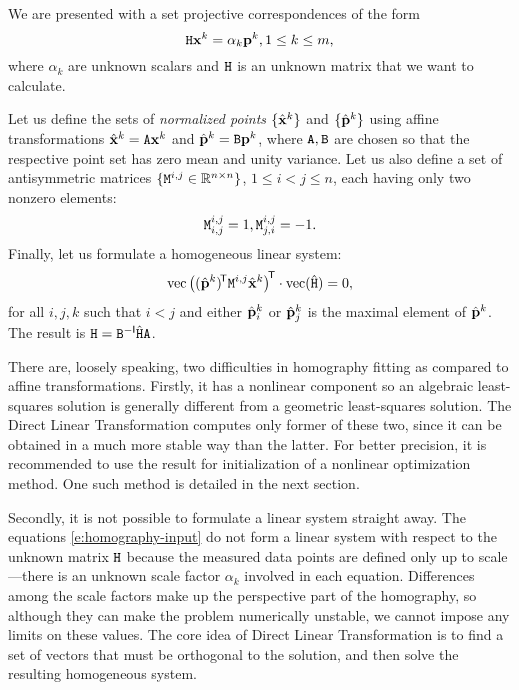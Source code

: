 We are presented with a set projective correspondences of the form
\begin{equation} \label{e:homography-input}
\mathtt{H} \mathbf{x}^k = \alpha_k \mathbf{p}^k, 1 \leq k \leq m,
\end{equation}
where $\alpha_k$ are unknown scalars and $\mathtt{H}$ is an unknown matrix that we want to calculate.

Let us define the sets of \textit{normalized points} $\{ \hat{\mathbf{x}}^k \}$ and $\{ \hat{\mathbf{p}}^k \}$ using affine transformations $\hat{\mathbf{x}}^k = \mathtt{A} \mathbf{x}^k$ and $\hat{\mathbf{p}}^k = \mathtt{B} \mathbf{p}^k$, where $\mathtt{A}, \mathtt{B}$ are chosen so that the respective point set has zero mean and unity variance.
Let us also define a set of antisymmetric matrices $\{\mathtt{M}^{i, j} \in \mathbb{R}^{n \times n}\}$, $1 \leq i < j \leq n$, each having only two nonzero elements:
\begin{equation} \label{e:homography-antisymm}
\mathtt{M}^{i, j}_{i, j} = 1,
\mathtt{M}^{i, j}_{j, i} = -1.
\end{equation}
Finally, let us formulate a homogeneous linear system:
\begin{equation} \label{e:homography-system}
\mathrm{vec} \left(({\hat{\mathbf{p}}}^k)^{\!\mathsf{T}} \mathtt{M}^{i, j} {\hat{\mathbf{x}}}^k \right)^{\!\mathsf{T}} \cdot \mathrm{vec}(\hat{\mathtt{H}}) = 0,
\end{equation}
for all $i, j, k$ such that $i < j$ and either $\hat{\mathbf{p}}^k_i$ or $\hat{\mathbf{p}}^k_j$ is the maximal element of $\hat{\mathbf{p}}^k$.
The result is $\mathtt{H} = \mathtt{B} ^{-\mathsf{I}} \hat{\mathtt{H}} \mathtt{A}$.

There are, loosely speaking, two difficulties in homography fitting as compared to affine transformations.
Firstly, it has a nonlinear component so an algebraic least-squares solution is generally different from a geometric least-squares solution.
The Direct Linear Transformation computes only former of these two, since it can be obtained in a much more stable way than the latter.
For better precision, it is recommended to use the result for initialization of a nonlinear optimization method.
One such method is detailed in the next section.

Secondly, it is not possible to formulate a linear system straight away.
The equations \eqref{e:homography-input} do not form a linear system with respect to the unknown matrix $\mathtt{H}$ because the measured data points are defined only up to scale---there is an unknown scale factor $\alpha_k$ involved in each equation.
Differences among the scale factors make up the perspective part of the homography, so although they can make the problem numerically unstable, we cannot impose any limits on these values.
The core idea of Direct Linear Transformation is to find a set of vectors that must be orthogonal to the solution, and then solve the resulting homogeneous system.

